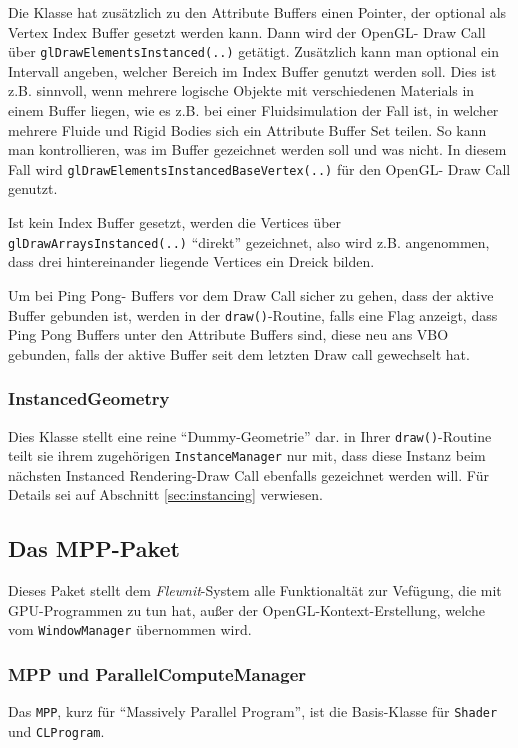 	Die Klasse hat zusätzlich zu den Attribute Buffers einen Pointer, der optional als Vertex Index Buffer
	gesetzt werden kann. Dann wird der OpenGL- Draw Call über \lstinline|glDrawElementsInstanced(..)|
	getätigt.
	Zusätzlich kann man optional ein Intervall angeben, welcher Bereich 
	im Index Buffer genutzt werden soll.
	Dies ist z.B. sinnvoll, wenn mehrere logische Objekte mit verschiedenen Materials in einem Buffer
	liegen, wie es z.B. bei einer Fluidsimulation der Fall ist, in welcher mehrere Fluide und Rigid Bodies sich
	ein Attribute Buffer Set teilen. So kann man kontrollieren, was im Buffer gezeichnet werden soll und was nicht.
	In diesem Fall wird \lstinline|glDrawElementsInstancedBaseVertex(..)| für den OpenGL- Draw Call genutzt.
	
	Ist kein Index Buffer gesetzt, werden die Vertices über \lstinline|glDrawArraysInstanced(..)|	
	 "`direkt"' gezeichnet, also wird z.B. angenommen, dass drei hintereinander liegende Vertices ein Dreick bilden. 
	
	Um bei Ping Pong- Buffers vor dem Draw Call sicher zu gehen, dass der aktive Buffer gebunden ist,
	werden in der \lstinline|draw()|-Routine, falls eine Flag anzeigt, dass Ping Pong Buffers unter den 
	Attribute Buffers sind, diese neu ans VBO gebunden, falls der aktive Buffer seit dem letzten Draw call gewechselt hat.
	
	
	\subsubsection{InstancedGeometry}
	Dies Klasse stellt eine reine "`Dummy-Geometrie"' dar. in Ihrer \lstinline|draw()|-Routine teilt sie ihrem
	zugehörigen \lstinline|InstanceManager| nur mit, dass diese Instanz beim nächsten Instanced Rendering-Draw Call
	ebenfalls gezeichnet werden will. Für Details sei auf Abschnitt \ref{sec:instancing} verwiesen.
	
	

\subsection{Das MPP-Paket}

Dieses Paket stellt dem \emph{Flewnit}-System alle Funktionaltät zur Vefügung, die mit
GPU-Programmen zu tun hat, außer der OpenGL-Kontext-Erstellung,
welche vom \lstinline|WindowManager| übernommen wird.


	\subsubsection{MPP und ParallelComputeManager}
	Das \lstinline|MPP|, kurz für "`Massively Parallel Program"', ist die Basis-Klasse für
	\lstinline|Shader| und \lstinline|CLProgram|.
	
